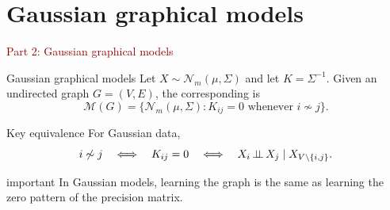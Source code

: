 \documentclass[dvipsnames,aspectratio=169,handout]{beamer}
\begin{document}

\section{Gaussian graphical models}

\begin{frame}{}
\begin{center}
{\Huge \textcolor{DarkRed}{Part 2: Gaussian graphical models}}
\end{center}
\end{frame}

\begin{frame}{Gaussian graphical models}
Let $X\sim \mathcal N_m(\mu,\Sigma)$ and let $K=\Sigma^{-1}$.
Given an undirected graph $G=(V,E)$, the corresponding  is
\[
\mathcal M(G)=\bigl\{\mathcal N_m(\mu,\Sigma): K_{ij}=0 \text{ whenever } i\not\sim j\bigr\}.
\]

\begin{alertblock}{Key equivalence}
For Gaussian data,
\[
i\not\sim j
\quad\Longleftrightarrow\quad
K_{ij}=0
\quad\Longleftrightarrow\quad
X_i\mbox{\,$\perp\!\!\!\perp$\,} X_j\mid X_{V\setminus\{i,j\}}.
\]
\end{alertblock}

\begin{beamercolorbox}[wd=\textwidth,sep=7pt,center,rounded=true,shadow=true]{important}
In Gaussian models, learning the graph is the same as learning the zero pattern of the precision matrix.
\end{beamercolorbox}
\end{frame}
\end{document}
